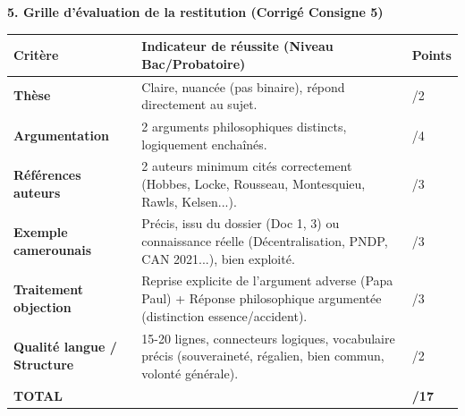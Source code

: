 \documentclass[11pt]{article}
\begin{document}
\begin{exoresolu}
\noindent\textbf{5. Grille d'évaluation de la restitution (Corrigé Consigne 5)}
\begin{center}
\begin{tabularx}{\linewidth}{|l|X|X|}\hline
\rowcolor{popblueL}
\textbf{Critère} & \textbf{Indicateur de réussite (Niveau Bac/Probatoire)} & \textbf{Points} \\ \hline
\textbf{Thèse} & Claire, nuancée (pas binaire), répond directement au sujet. & /2 \\ \hline
\textbf{Argumentation} & 2 arguments philosophiques distincts, logiquement enchaînés. & /4 \\ \hline
\textbf{Références auteurs} & 2 auteurs minimum cités correctement (Hobbes, Locke, Rousseau, Montesquieu, Rawls, Kelsen...). & /3 \\ \hline
\textbf{Exemple camerounais} & Précis, issu du dossier (Doc 1, 3) ou connaissance réelle (Décentralisation, PNDP, CAN 2021...), bien exploité. & /3 \\ \hline
\textbf{Traitement objection} & Reprise explicite de l'argument adverse (Papa Paul) + Réponse philosophique argumentée (distinction essence/accident). & /3 \\ \hline
\textbf{Qualité langue / Structure} & 15-20 lignes, connecteurs logiques, vocabulaire précis (souveraineté, régalien, bien commun, volonté générale). & /2 \\ \hline
\textbf{TOTAL} & & \textbf{/17} \\ \hline
\end{tabularx}
\end{center}

\end{exoresolu}
\end{document}
